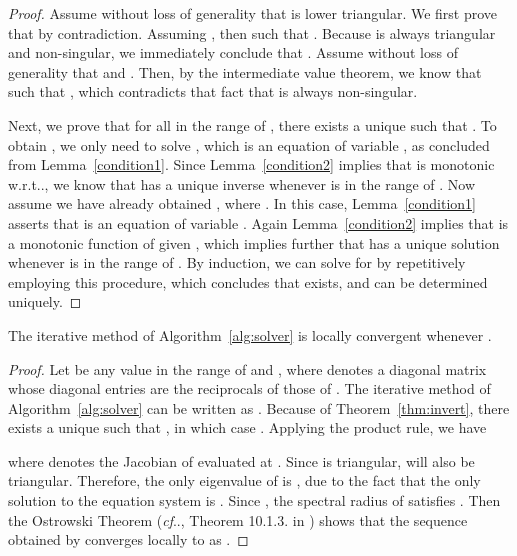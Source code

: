 \documentclass{article}
\makeatletter
\newtheorem{example}{Example}
\newenvironment{customthm}[1]
{\renewcommand\theinnercustomthm{#1}\innercustomthm}
{\endinnercustomthm}
\def\@onedot{\ifx\@let@token.\else.\null\fi\xspace}
\DeclareRobustCommand\onedot{\futurelet\@let@token\@onedot}
\newcommand{\algoref}[1]{Algorithm~\ref{#1}}
\newcommand{\thmref}[1]{Theorem~\ref{#1}}
\newcommand{\lemref}[1]{Lemma~\ref{#1}}
\def\cf{\emph{cf}\onedot}
\def\wrt{w.r.t\onedot}
\makeatother
\begin{document}
\begin{proof}
Assume without loss of generality that  is lower triangular. We first prove that  by contradiction. Assuming , then  such that . Because  is always triangular and non-singular, we immediately conclude that . Assume without loss of generality that  and . Then, by the intermediate value theorem, we know that  such that , which contradicts that fact that  is always non-singular.

Next, we prove that for all  in the range of , there exists a unique  such that . To obtain , we only need to solve , which is an equation of variable , as concluded from \lemref{condition1}. Since \lemref{condition2} implies that  is monotonic \wrt , we know that  has a unique inverse  whenever  is in the range of . Now assume we have already obtained , where . In this case, \lemref{condition1} asserts that  is an equation of variable . Again \lemref{condition2} implies that  is a monotonic function of  given , which implies further that  has a unique solution  whenever  is in the range of . By induction, we can solve for  by repetitively employing this procedure, which concludes that  exists, and can be determined uniquely. 




\end{proof}

\iffalse
We provide a toy example for Theorem \ref{thm:invert}.
\begin{example}\label{exp:thm1}
Let 
Clearly,  satisfies . More specifically, if we want to solve , what we do is that we first solve , which gives us . Then, let's plug in  to the second and third equation, which gives us  and . Let's now solve the second equation , which implies . Plugging in  to the third equation, we got , which implies . In this case, we are able to find the inverse of  at . 
\end{example}
\fi

\begin{customthm}{\ref{thm:converge}}
The iterative method of \algoref{alg:solver} is locally convergent whenever .
\end{customthm}
\begin{proof}
    Let  be any value in the range of  and , where  denotes a diagonal matrix whose diagonal entries are the reciprocals of those of . The iterative method of \algoref{alg:solver} can be written as . Because of \thmref{thm:invert}, there exists a unique  such that , in which case . Applying the product rule, we have
    
    where  denotes the Jacobian of  evaluated at . Since  is triangular,  will also be triangular. Therefore, the only eigenvalue of  is , due to the fact that the only solution to the equation system  is . Since , the spectral radius of  satisfies . Then the Ostrowski Theorem (\cf, Theorem 10.1.3. in \cite{ortega1970iterative}) shows that the sequence  obtained by  converges locally to  as .
\end{proof}
\end{document}
